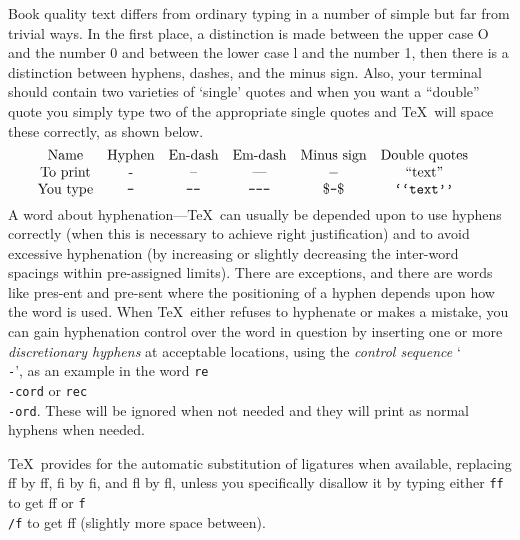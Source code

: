 Book quality text differs from ordinary typing in a number of simple but
far from trivial ways.  In the first place, a distinction is made between
the upper case O and the number 0 and between the lower case l and the number 1,
then there is a distinction between hyphens, dashes, and the minus sign.
Also, your terminal should contain two varieties of `single' quotes and
when you want a ``double'' quote you simply type two of the appropriate
single quotes and \TeX\ will space these correctly, as shown below.
$$\vbox{\halign {\hfil #\hfil\quad &\hfil #\hfil\quad &\hfil #\hfil\quad&
\hfil #\hfil\quad &\hfil #\hfil\quad&\hfil #\hfil\quad \cr
Name&Hyphen&En-dash&Em-dash&Minus sign&Double quotes\cr
To print&-&--&---&$-$&``text''\cr
You type&\tt -&\tt -{}-&\tt -{}-{}-{}&$\$${\tt -}$\$$&\tt `{}`text'{}'\cr}}$$
A word about hyphenation---\TeX\ can usually be depended upon to use
hyphens correctly (when this is necessary to achieve right justification) and
to avoid excessive hyphenation (by increasing or slightly decreasing
the inter-word spacings within pre-assigned limits).
There are exceptions,
and there are words like pres-ent and
pre-sent where the positioning of a hyphen depends upon how the word is
used.  When \TeX\ either refuses to hyphenate or makes a mistake, you can
gain hyphenation control over the word in question by inserting one or
more {\sl discretionary hyphens\/} at acceptable locations, using the {\sl
control sequence\/} `{\tt \\-}', as an example in the word {\tt re\\-cord}
or {\tt rec\\-ord}.  These will be ignored when not needed and they will
print as normal hyphens when needed.

\TeX\ provides for the automatic substitution of ligatures when available,
replacing f\/f by ff, f\/i by fi, and f\/l by fl, unless
you specifically disallow it by typing either {\tt \hbox\lbr f\lbr \rbr f\rbr}
to get \hbox{f{}f} or {\tt f\\/f} to get f\/f (slightly more space between).

